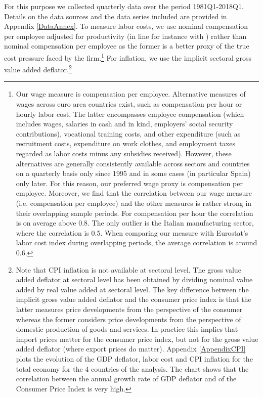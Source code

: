 \documentclass[11pt]{article}
\begin{document}
For this purpose we collected quarterly data over the period 1981Q1-2018Q1. Details on the data sources and the data series included are provided in Appendix \ref{DataAnnex}. To measure labor costs, we use nominal compensation per employee adjusted for productivity (in line for instance with \cite{Peneva_Rudd_2017}) rather than nominal compensation per employee as the former is a better proxy of the true cost pressure faced by the firm.\footnote{Our wage measure is compensation per employee. Alternative measures of wages across euro area countries exist, such as compensation per hour or hourly labor cost. The latter encompasses employee compensation (which includes wages, salaries in cash and in kind, employers’ social security contributions), vocational training costs, and other expenditure (such as recruitment costs, expenditure on work clothes, and employment taxes regarded as labor costs minus any subsidies received). However, these alternatives are generally consistently available across sectors and countries on a quarterly basis only since 1995 and in some cases (in particular Spain) only later. For this reason, our preferred wage proxy is compensation per employee. Moreover, we find that the correlation between our wage measure (i.e. compensation per employee) and the other measures is rather strong in their overlapping sample periods. For compensation per hour the correlation is on average above 0.8. The only outlier is the Italian manufacturing sector, where the correlation is 0.5. When comparing our measure with Eurostat's labor cost index during overlapping periods, the average correlation is around 0.6.} For inflation, we use the implicit sectoral gross value added deflator.\footnote{Note that CPI inflation is not available at sectoral level. The gross value added deflator at sectoral level has been obtained by dividing nominal value added by real value added at sectoral level. The key difference between the implicit gross value added deflator and the consumer price index is that the latter measures price developments from the perspective of the consumer whereas the former considers price developments from the perspective of domestic production of goods and services. In practice this implies that import prices matter for the consumer price index, but not for the gross value added deflator (where export prices do matter). Appendix \ref{AppendixCPI} plots the evolution of the GDP deflator, labor cost and CPI inflation for the total economy for the 4 countries of the analysis. The chart shows that the correlation between the annual growth rate of GDP deflator and of the Consumer Price Index is very high.}
\end{document}
